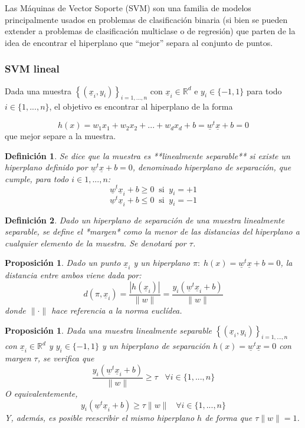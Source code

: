 \documentclass[12pt,a4paper,]{book}
\newcounter{dummy}
\numberwithin{dummy}{section}
\theoremstyle{ocrenumbox}
\theoremstyle{blacknumex}
\theoremstyle{blacknumbox}
\newtheorem{definitionT}{Definición}[section]  %
\theoremstyle{ocrenum}
\newtheorem{proposition}[dummy]{Proposición} %
\newenvironment{definition}{\begin{dBox}\begin{definitionT}}{\end{definitionT}\end{dBox}}
\theoremstyle{ocrenum}
\begin{document}
Las Máquinas de Vector Soporte (SVM) son una familia de modelos
principalmente usados en problemas de clasificación binaria (si bien se
pueden extender a problemas de clasificación multiclase o de regresión)
que parten de la idea de encontrar el hiperplano que ``mejor'' separa al
conjunto de puntos.

\hypertarget{svm-lineal}{%
\subsubsection{SVM lineal}\label{svm-lineal}}

Dada una muestra \(\left\{(\underline x_i,y_i) \right\}_{i=1,...,n}\)
con \(\underline x_i \in \mathbb{R}^d\) e \(y_i \in \{-1,1\}\) para todo
\(i \in \{1,...,n\}\), el objetivo es encontrar al hiperplano de la
forma

\[h(x) = w_1x_1 +w_2x_2+...+w_dx_d +b = \underline w^t \underline x + b= 0 \]
que mejor separe a la muestra.

\begin{definition}
Se dice que la muestra es **linealmente separable** si existe un hiperplano definido por $\underline w^t \underline x + b= 0$, denominado hiperplano de separación, que cumple, para todo $i \in 1,...,n$:
$$\underline w^t \underline x_i + b \ge 0 \; \; \text{si} \;\; y_i=+1$$
$$\underline w^t \underline x_i + b \le 0 \; \; \text{si} \;\; y_i=-1$$
\end{definition}

\begin{definition}
Dado un hiperplano de separación de una muestra linealmente separable, se define el *margen* como la menor de las distancias del hiperplano a cualquier elemento de la muestra. Se denotará por $\tau$.
\end{definition}

\begin{proposition}
Dado un punto $\underline x_i$ y un hiperplano $\pi :\;h(x) = \underline w^t \underline x + b= 0$, la distancia entre ambos viene dada por:
$$d(\pi,\underline x_i) = \frac{|h(\underline x_i)|}{\|w\|} = \frac{y_i(\underline w^t \underline x_i+b)}{\|w\|}$$
donde $\|\cdot\|$ hace referencia a la norma euclídea.
\end{proposition}

\begin{proposition}
Dada una muestra linealmente separable $\left\{(\underline x_i,y_i) \right\}_{i=1,...,n}$ con $\underline x_i \in \mathbb{R}^d$ y $y_i \in \{-1,1\}$ y un hiperplano de separación $h(x) = \underline w^t \underline x = 0$ con margen $\tau$, se verifica que
$$\frac{y_i(\underline w^t \underline x_i+b)}{\|w\|} \ge \tau \;\;\; \forall i\in \{1,...,n\}$$
O equivalentemente,
$$y_i(\underline w^t \underline x_i+b) \ge \tau\|w\| \;\;\; \forall i\in \{1,...,n\}$$
Y, además, es posible reescribir el mismo hiperplano $h$ de forma que $\tau\|w\| = 1$.
\end{proposition}
\end{document}
